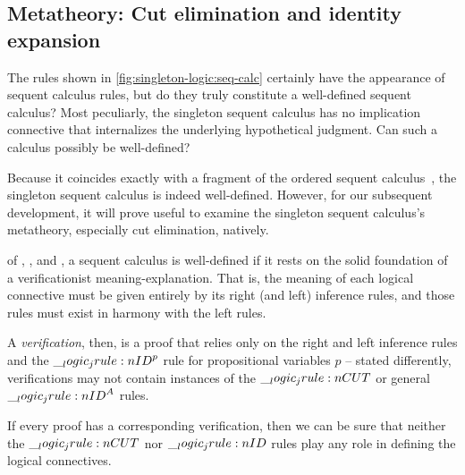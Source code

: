 \subsection{Metatheory: Cut elimination and identity expansion}\label{sec:singleton-logic:seq-calc:metatheory}

The rules shown in \cref{fig:singleton-logic:seq-calc} certainly have the appearance of sequent calculus rules, but do they truly constitute a well-defined sequent calculus?
Most peculiarly, the singleton sequent calculus has no implication connective that internalizes the underlying hypothetical judgment.
Can such a calculus possibly be well-defined?

Because it coincides exactly with a fragment of the ordered sequent calculus~, the singleton sequent calculus is indeed well-defined.
However, for our subsequent development, it will prove useful to examine the singleton sequent calculus's metatheory, especially cut elimination, natively.

 of \citeauthor{Gentzen:MZ35}, \citeauthor{Dummett:WJ76}, and \citeauthor{Martin-Lof:Siena83}\autocites{Gentzen:MZ35}{Dummett:WJ76}{Martin-Lof:Siena83}, a sequent calculus is well-defined if it rests on the solid foundation of a verificationist meaning-explanation.
That is, the meaning of each logical connective must be given entirely by its right (and left) inference rules, and those rules must exist in harmony with the left rules.

A \emph{verification}, then, is a proof that relies only on the right and left inference rules and the $\__logic_jrule:n {ID}^{p}$ rule for propositional variables $p$ -- stated differently, verifications may not contain instances of the $\__logic_jrule:n {CUT}$ or general $\__logic_jrule:n {ID}^A$ rules.

If every proof has a corresponding verification, then we can be sure that neither the $\__logic_jrule:n {CUT}$ nor $\__logic_jrule:n {ID}$ rules play any role in defining the logical connectives.

